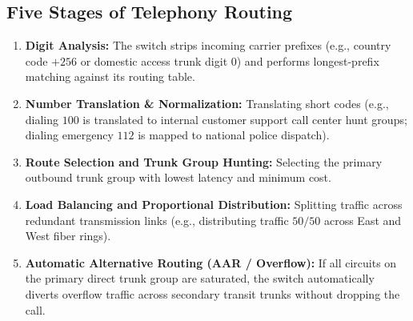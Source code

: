 \documentclass[12pt,a4paper]{report}
\begin{document}
\subsection{Five Stages of Telephony Routing}
\begin{enumerate}
    \item \textbf{Digit Analysis:} The switch strips incoming carrier prefixes (e.g., country code $+256$ or domestic access trunk digit $0$) and performs longest-prefix matching against its routing table.
    \item \textbf{Number Translation \& Normalization:} Translating short codes (e.g., dialing $100$ is translated to internal customer support call center hunt groups; dialing emergency $112$ is mapped to national police dispatch).
    \item \textbf{Route Selection and Trunk Group Hunting:} Selecting the primary outbound trunk group with lowest latency and minimum cost.
    \item \textbf{Load Balancing and Proportional Distribution:} Splitting traffic across redundant transmission links (e.g., distributing traffic $50/50$ across East and West fiber rings).
    \item \textbf{Automatic Alternative Routing (AAR / Overflow):} If all circuits on the primary direct trunk group are saturated, the switch automatically diverts overflow traffic across secondary transit trunks without dropping the call.
\end{enumerate}
\end{document}
